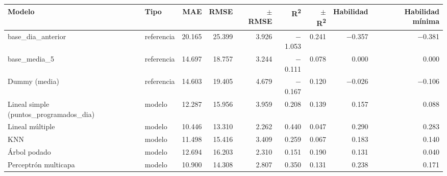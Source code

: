 \begin{tabular}{llrrrrrrr}
\toprule
Modelo & Tipo & MAE & RMSE & $\pm$ RMSE & R\textsuperscript{2} & $\pm$ R\textsuperscript{2} & Habilidad & Habilidad mínima \\
\midrule
base\_dia\_anterior & referencia & 20.165 & 25.399 & 3.926 & $-$1.053 & 0.241 & $-$0.357 & $-$0.381 \\
base\_media\_5 & referencia & 14.697 & 18.757 & 3.244 & $-$0.111 & 0.078 & 0.000 & 0.000 \\
Dummy (media) & referencia & 14.603 & 19.405 & 4.679 & $-$0.167 & 0.120 & $-$0.026 & $-$0.106 \\
Lineal simple (puntos\_programados\_dia) & modelo & 12.287 & 15.956 & 3.959 & 0.208 & 0.139 & 0.157 & 0.088 \\
Lineal múltiple & modelo & 10.446 & 13.310 & 2.262 & 0.440 & 0.047 & 0.290 & 0.283 \\
KNN & modelo & 11.498 & 15.416 & 3.409 & 0.259 & 0.067 & 0.183 & 0.140 \\
Árbol podado & modelo & 12.694 & 16.203 & 2.310 & 0.151 & 0.190 & 0.131 & 0.040 \\
Perceptrón multicapa & modelo & 10.900 & 14.308 & 2.807 & 0.350 & 0.131 & 0.238 & 0.171 \\
\bottomrule
\end{tabular}
